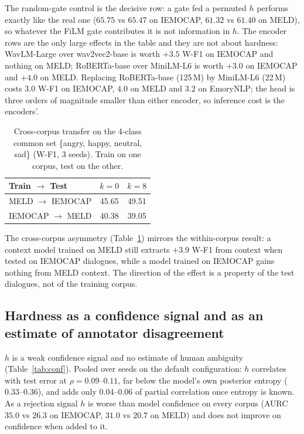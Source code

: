 \documentclass[journal]{IEEEtran}
\newcommand{\wf}{W-F1}
\begin{document}
The random-gate control is the decisive row: a gate fed a permuted $h$ performs exactly like the real one ($65.75$ vs $65.47$ on IEMOCAP, $61.32$ vs $61.40$ on MELD), so whatever the FiLM gate contributes it is not information in $h$. The encoder rows are the only large effects in the table and they are not about hardness: WavLM-Large over wav2vec2-base is worth $+3.5$ \wf{} on IEMOCAP and nothing on MELD; RoBERTa-base over MiniLM-L6 is worth $+3.0$ on IEMOCAP and $+4.0$ on MELD. Replacing RoBERTa-base (125\,M) by MiniLM-L6 (22\,M) costs $3.0$ \wf{} on IEMOCAP, $4.0$ on MELD and $3.2$ on EmoryNLP; the head is three orders of magnitude smaller than either encoder, so inference cost is the encoders'.

\begin{table}[t]\centering\small
\caption{Cross-corpus transfer on the 4-class common set \{angry, happy, neutral, sad\} (\wf, 3 seeds). Train on one corpus, test on the other.}\label{tab:cross}
\begin{tabular}{lcc}\toprule
Train $\rightarrow$ Test & $k = 0$ & $k = 8$ \\ \midrule
MELD $\rightarrow$ IEMOCAP & 45.65 & 49.51 \\
IEMOCAP $\rightarrow$ MELD & 40.38 & 39.05 \\ \bottomrule
\end{tabular}
\end{table}

The cross-corpus asymmetry (Table~\ref{tab:cross}) mirrors the within-corpus result: a context model trained on MELD still extracts $+3.9$ \wf{} from context when tested on IEMOCAP dialogues, while a model trained on IEMOCAP gains nothing from MELD context. The direction of the effect is a property of the test dialogues, not of the training corpus.

\subsection{Hardness as a confidence signal and as an estimate of annotator disagreement}\label{sec:conf}
$h$ is a weak confidence signal and no estimate of human ambiguity (Table~\ref{tab:conf}). Pooled over seeds on the default configuration: $h$ correlates with test error at $\rho = 0.09$--$0.11$, far below the model's own posterior entropy ($0.33$--$0.36$), and adds only $0.04$--$0.06$ of partial correlation once entropy is known. As a rejection signal $h$ is worse than model confidence on every corpus (AURC $35.0$ vs $26.3$ on IEMOCAP, $31.0$ vs $20.7$ on MELD) and does not improve on confidence when added to it.
\end{document}
